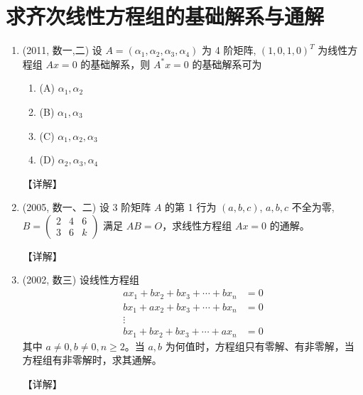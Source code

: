 \documentclass[12pt, a4paper, oneside, UTF8]{ctexbook}
\begin{document}
\section{求齐次线性方程组的基础解系与通解}

\begin{enumerate}[label=\arabic*.,start=2]
    \item (2011, 数一,二) 设 $A = (\alpha_1, \alpha_2, \alpha_3, \alpha_4)$ 为 4 阶矩阵, $(1,0,1,0)^T$ 为线性方程组 $Ax = 0$ 的基础解系，则 $A^* x = 0$ 的基础解系可为
    \begin{enumerate}
        \item (A) $\alpha_1, \alpha_2$
        \item (B) $\alpha_1, \alpha_3$
        \item (C) $\alpha_1, \alpha_2, \alpha_3$
        \item (D) $\alpha_2, \alpha_3, \alpha_4$
    \end{enumerate}
    
    \begin{solution}
    【详解】
    \end{solution}
    
    \item (2005, 数一、二) 设 3 阶矩阵 $A$ 的第 1 行为 $(a, b, c)$, $a, b, c$ 不全为零, $B = \begin{pmatrix} 2 & 4 & 6 \\ 3 & 6 & k \end{pmatrix}$ 满足 $AB = O$，求线性方程组 $Ax = 0$ 的通解。
    
    \begin{solution}
    【详解】
    \end{solution}
    
    \item (2002, 数三) 设线性方程组
    \begin{align*}
    a x_1 + b x_2 + b x_3 + \cdots + b x_n &= 0 \\
    b x_1 + a x_2 + b x_3 + \cdots + b x_n &= 0 \\
    \vdots \\
    b x_1 + b x_2 + b x_3 + \cdots + a x_n &= 0
    \end{align*}
    其中 $a \neq 0, b \neq 0, n \geq 2$。当 $a, b$ 为何值时，方程组只有零解、有非零解，当方程组有非零解时，求其通解。
    
    \begin{solution}
    【详解】
    \end{solution}
\end{enumerate}
\end{document}
